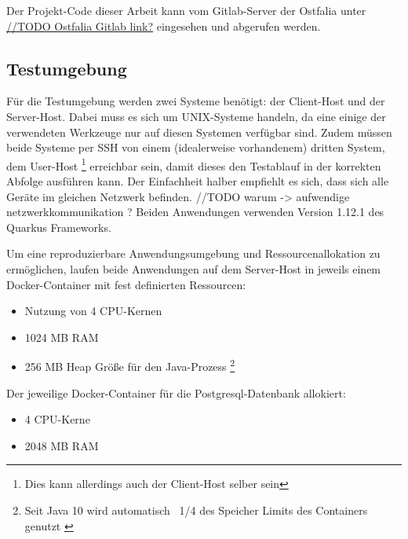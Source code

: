 Der Projekt-Code dieser Arbeit kann vom Gitlab-Server der Ostfalia unter
\url{//TODO Ostfalia Gitlab link?} eingesehen und abgerufen werden.

\subsection{Testumgebung}
\label{section:testumgebung}
Für die Testumgebung werden zwei Systeme benötigt: der Client-Host und der Server-Host.
Dabei muss es sich um UNIX-Systeme handeln, da eine einige der verwendeten Werkzeuge nur
auf diesen Systemen verfügbar sind.
Zudem müssen beide Systeme per SSH von einem (idealerweise vorhandenem) dritten System, dem User-Host
\footnote{Dies kann allerdings auch der Client-Host selber sein}
erreichbar sein, damit dieses den Testablauf in der korrekten Abfolge ausführen kann.
Der Einfachheit halber empfiehlt es sich, dass sich alle Geräte im gleichen Netzwerk befinden.
//TODO warum -> aufwendige netzwerkkommunikation ?
Beiden Anwendungen verwenden Version 1.12.1 des Quarkus Frameworks.

Um eine reproduzierbare Anwendungsumgebung und Ressourcenallokation zu ermöglichen, laufen beide Anwendungen auf dem Server-Host in
jeweils einem Docker-Container mit fest definierten Ressourcen:
\begin{itemize}
    \item Nutzung von 4 CPU-Kernen
    \item 1024 MB RAM
    \item 256 MB Heap Größe für den Java-Prozess
          \footnote{Seit Java 10 wird automatisch ~1/4 des Speicher Limits des Containers genutzt \parencite{Java10ReleaseNotes}}
\end{itemize}
Der jeweilige Docker-Container für die Postgresql-Datenbank allokiert:
\begin{itemize}
    \item 4 CPU-Kerne
    \item 2048 MB RAM
\end{itemize}


